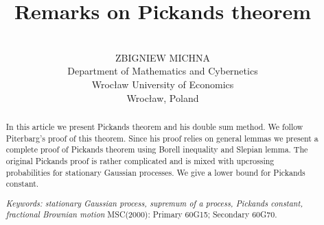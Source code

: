  \usepackage{./extract}
\newtheorem{theorem}{Theorem}
\newtheorem{lemma}{Lemma}
\newtheorem{proposition}{Proposition}
\newtheorem{definition}{Definition}
\newtheorem{corollary}{Corollary}
\newtheorem{assumption}{Assumption}
\newtheorem{remark}{Remark}
\newtheorem{example}{Example}
\renewcommand{\baselinestretch}{1.1}
\renewcommand{\abstractname}{\bf Abstract}
\renewcommand{\floatpagefraction}{1}

\mathsurround=2pt

\title{\bf Remarks on Pickands theorem}
\author{
\\
ZBIGNIEW MICHNA\\
Department of Mathematics and Cybernetics\\
Wroc{\l}aw University of Economics\\
Wroc{\l}aw, Poland}
\date{}








\maketitle

\begin{abstract}
In this article we present Pickands theorem and his double sum method. We follow Piterbarg's
proof of this theorem. 
Since his proof relies on general lemmas we present a complete proof of Pickands
theorem using Borell inequality and Slepian lemma.
The original Pickands proof is rather complicated
and is mixed with upcrossing probabilities for stationary Gaussian processes. We give a lower bound for 
Pickands constant.

\vspace{5mm}
{\it Keywords: stationary Gaussian process, supremum of a process, Pickands constant, fractional Brownian motion}
\newline
\vspace{2cm}
MSC(2000): Primary 60G15; Secondary 60G70.
\end{abstract}

